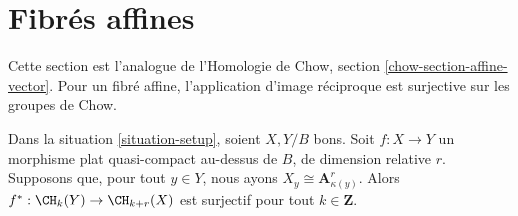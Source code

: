 \section{Fibrés affines}
\label{section-affine-vector}

\noindent
Cette section est l'analogue de l'Homologie de Chow, section
\ref{chow-section-affine-vector}. Pour un fibré affine, l'application d'image réciproque
est surjective sur les groupes de Chow.

\begin{lemma}
\label{lemma-pullback-affine-fibres-surjective}
Dans la situation \ref{situation-setup}, soient $X, Y/B$ bons. Soit $f :
X \to Y$ un morphisme plat quasi-compact au-dessus de $B$, de dimension relative $r$.
Supposons que, pour tout $y \in Y$, nous ayons $X_y \cong
\mathbf{A}^r_{\kappa(y)}$. Alors $f^* : \CH_k(Y) \to \CH_{k + r}(X)$ est
surjectif pour tout $k \in \mathbf{Z}$.
\end{lemma}

